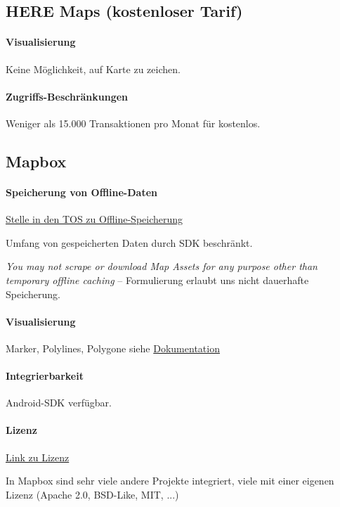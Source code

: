 \documentclass[11pt]{article} %
\begin{document}
\subsection{HERE Maps (kostenloser Tarif)}


\paragraph{Visualisierung} Keine Möglichkeit, auf Karte zu zeichen.

\paragraph{Zugriffs-Beschränkungen} Weniger als 15.000 Transaktionen pro Monat für kostenlos.


\subsection{Mapbox}

\paragraph{Speicherung von Offline-Daten}
\begin{cptitemize} 
		\item \href{https://www.mapbox.com/tos/#[YmtcYmns]}{Stelle in den TOS zu Offline-Speicherung} 
       	 \item Umfang von gespeicherten Daten durch SDK beschränkt.
       	 \item \textit{You may not scrape or download Map Assets for any purpose other than temporary offline caching} -- Formulierung erlaubt uns nicht dauerhafte Speicherung.
\end{cptitemize}       

\paragraph{Visualisierung} Marker, Polylines, Polygone siehe \href{https://www.mapbox.com/android-docs/map-sdk/overview/annotations/}{Dokumentation}

\paragraph{Integrierbarkeit} Android-SDK verfügbar.

\paragraph{Lizenz} 
\begin{cptitemize} 
   	 \item \href{https://github.com/mapbox/mapbox-gl-native/blob/master/LICENSE.md}{Link zu Lizenz}
   	 \item In Mapbox sind sehr viele andere Projekte integriert, viele mit einer eigenen Lizenz (Apache 2.0, BSD-Like, MIT, ...)
\end{cptitemize}   
\end{document}
